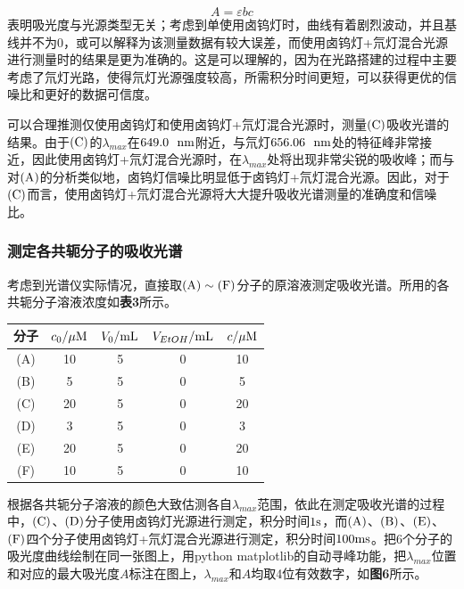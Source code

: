 \documentclass[12pt]{article}
\begin{document}
$$ A=\varepsilon bc $$
表明吸光度与光源类型无关；考虑到单使用卤钨灯时，曲线有着剧烈波动，并且基线并不为0，或可以解释为该测量数据有较大误差，而使用卤钨灯+氘灯混合光源进行测量时的结果是更为准确的。这是可以理解的，因为在光路搭建的过程中主要考虑了氘灯光路，使得氘灯光源强度较高，所需积分时间更短，可以获得更优的信噪比和更好的数据可信度。\par 
可以合理推测仅使用卤钨灯和使用卤钨灯+氘灯混合光源时，测量${\rm (C)}$吸收光谱的结果。由于${\rm (C)}$的$\lambda_{max}$在$649.0\ \ {\rm nm}$附近，与氘灯$656.06\ \ {\rm nm}$处的特征峰非常接近，因此使用卤钨灯+氘灯混合光源时，在$\lambda_{max}$处将出现非常尖锐的吸收峰；而与对${\rm (A)}$的分析类似地，卤钨灯信噪比明显低于卤钨灯+氘灯混合光源。因此，对于${\rm (C)}$而言，使用卤钨灯+氘灯混合光源将大大提升吸收光谱测量的准确度和信噪比。
 
 \subsubsection{测定各共轭分子的吸收光谱}
考虑到光谱仪实际情况，直接取$\rm (A)\sim(F)$分子的原溶液测定吸收光谱。所用的各共轭分子溶液浓度如\textbf{表3}所示。\par 
 \begin{table}[h]
	\centering
\begin{tabular}{ccccc}
	\toprule
	分子 & $c_{0}/\mu{\rm M}$ & $V_{0}/{\rm mL}$ & $V_{EtOH}/{\rm mL}$ & $c/\mu{\rm M}$  \\
	\midrule
	(A) & 10 & 5 & 0 & 10 \\
	(B) & 5 & 5 & 0 & 5 \\
	(C) & 20 & 5 & 0 & 20 \\
	(D) & 3 & 5 & 0 & 3 \\
	(E) & 20 & 5 & 0 & 20 \\
	(F) & 10 & 5 & 0 & 10 \\
	\bottomrule
\end{tabular}
\end{table}
\par
根据各共轭分子溶液的颜色大致估测各自$\lambda_{max}$范围，依此在测定吸收光谱的过程中，$\rm (C)$、$\rm (D)$分子使用卤钨灯光源进行测定，积分时间$1 {\rm s}$，而$\rm (A)$、$\rm (B)$、$\rm (E)$、$\rm (F)$四个分子使用卤钨灯+氘灯混合光源进行测定，积分时间$100 {\rm ms}$。把6个分子的吸光度曲线绘制在同一张图上，用python matplotlib的自动寻峰功能，把$\lambda_{max}$位置和对应的最大吸光度$A$标注在图上，$\lambda_{max}$和$A$均取4位有效数字，如\textbf{图6}所示。
\end{document}
